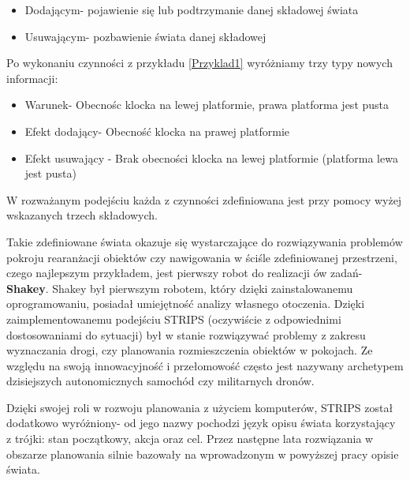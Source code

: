     \begin{itemize}
        \item Dodającym- pojawienie się lub podtrzymanie danej składowej świata
        \item Usuwającym- pozbawienie świata danej składowej
    \end{itemize}
    Po wykonaniu czynności z przykładu \ref{Przyklad1} wyróżniamy trzy typy nowych informacji:
    \begin{itemize}
        \item Warunek- Obecnośc klocka na lewej platformie, prawa platforma jest pusta
        \item Efekt dodający- Obecność klocka na prawej platformie
        \item Efekt usuwający - Brak obecności klocka na lewej platformie (platforma lewa jest pusta)
    \end{itemize}
    W rozważanym podejściu każda z czynności zdefiniowana jest przy pomocy wyżej wskazanych trzech składowych.

        Takie zdefiniowane świata okazuje się wystarczające do rozwiązywania problemów pokroju rearanżacji obiektów czy 
    nawigowania w ściśle zdefiniowanej przestrzeni, czego najlepszym przykładem, jest pierwszy robot do realizacji ów zadań- \textbf{Shakey}.
    Shakey był pierwszym robotem, który dzięki zainstalowanemu oprogramowaniu,
    posiadał umiejętność analizy własnego otoczenia. Dzięki zaimplementowanemu podejściu 
    STRIPS (oczywiście z odpowiednimi dostosowaniami do sytuacji) był w stanie rozwiązywać problemy z zakresu wyznaczania drogi,
    czy planowania rozmieszczenia obiektów w pokojach.
    Ze względu na swoją innowacyjność i przełomowość często jest nazywany archetypem
    dzisiejszych autonomicznych samochód czy militarnych dronów.

    Dzięki swojej roli w rozwoju planowania z użyciem komputerów, STRIPS został dodatkowo wyróżniony- od jego nazwy pochodzi język opisu świata korzystający
    z trójki: stan początkowy, akcja oraz cel. Przez następne lata rozwiązania w obszarze planowania silnie bazowały na wprowadzonym w powyższej pracy opisie świata.

